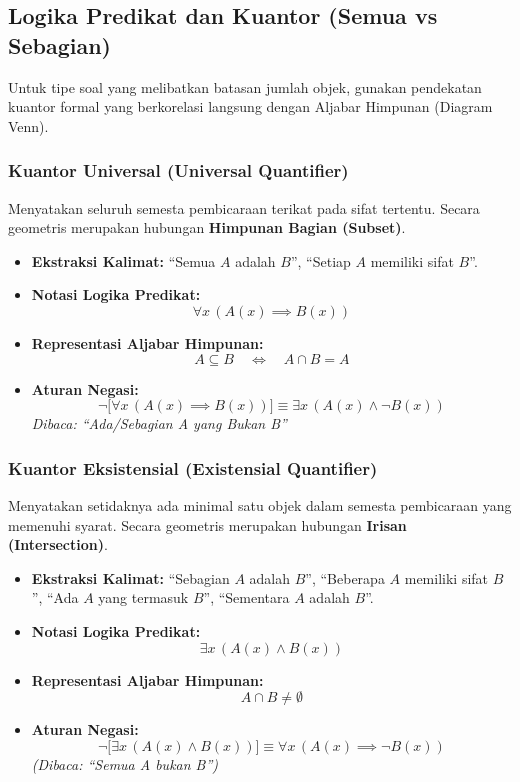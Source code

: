\subsection{Logika Predikat dan Kuantor (Semua vs Sebagian)}
Untuk tipe soal yang melibatkan batasan jumlah objek, gunakan pendekatan kuantor formal yang berkorelasi langsung dengan Aljabar Himpunan (Diagram Venn).

\subsubsection{Kuantor Universal (Universal Quantifier)}
Menyatakan seluruh semesta pembicaraan terikat pada sifat tertentu. Secara geometris merupakan hubungan \textbf{Himpunan Bagian (Subset)}.
\begin{itemize}
\item \textbf{Ekstraksi Kalimat: } ``Semua $A$ adalah $B$'', ``Setiap $A$ memiliki sifat $B$''.
\item \textbf{Notasi Logika Predikat: } \[ \forall x \, (A(x) \implies B(x))\]
\item \textbf{Representasi Aljabar Himpunan: } \[ A \subseteq B \quad \iff \quad A \cap B = A\]
\item \textbf{Aturan Negasi: }
  \[ \neg \big[ \forall x \, (A(x) \implies B(x)) \big] \equiv \exists x \, (A(x) \land \neg B(x)) \]
  \textit{Dibaca: ``Ada/Sebagian A yang Bukan B''}
\end{itemize}

\subsubsection{Kuantor Eksistensial (Existensial Quantifier)}
Menyatakan setidaknya ada minimal satu objek dalam semesta pembicaraan yang memenuhi syarat. Secara geometris merupakan hubungan \textbf{Irisan (Intersection)}.
\begin{itemize}
\item \textbf{Ekstraksi Kalimat: } ``Sebagian $A$ adalah $B$'', ``Beberapa $A$ memiliki sifat $B$'', ``Ada $A$ yang termasuk $B$'', ``Sementara $A$ adalah $B$''.
\item \textbf{Notasi Logika Predikat: } \[ \exists x \, (A(x) \land B(x)) \]
\item \textbf{Representasi Aljabar Himpunan: } \[ A \cap B \neq \emptyset \]
\item \textbf{Aturan Negasi: }\[ \neg \big[ \exists x \, (A(x) \land B(x))\big] \equiv \forall x \, (A(x) \implies \neg B(x)) \]
  \textit{(Dibaca: ``Semua A bukan B'')}
\end{itemize}

